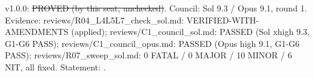 \begin{theorem}\label{reg:W2-LOC2_PLR}
\end{theorem}
\begin{statusbox}
 v1.0.0: \st{PROVED (by this seat, unchecked)}. Council: Sol 9.3 / Opus 9.1, round 1. Evidence: reviews/R04\_L4L5L7\_check\_sol.md: VERIFIED-WITH-AMENDMENTS (applied); reviews/C1\_council\_sol.md: PASSED (Sol xhigh 9.3, G1-G6 PASS); reviews/C1\_council\_opus.md: PASSED (Opus high 9.1, G1-G6 PASS); reviews/R07\_sweep\_sol.md: 0 FATAL / 0 MAJOR / 10 MINOR / 6 NIT, all fixed. Statement: .
\end{statusbox}
